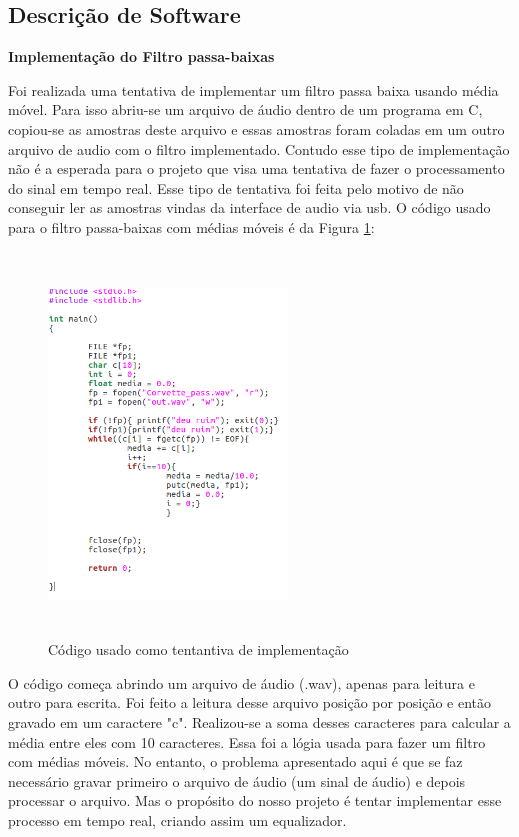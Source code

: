 \documentclass[conference]{IEEEtran}
\begin{document}
\subsection{Descrição de Software}

\begin{flushleft}

\textbf{Implementação do Filtro passa-baixas}
\end{flushleft}
 
Foi realizada uma tentativa de implementar um filtro passa baixa usando média móvel. Para isso abriu-se um arquivo de áudio dentro de um programa em C, copiou-se as amostras deste arquivo e essas amostras foram coladas em um outro arquivo de audio com o filtro implementado. 
Contudo esse tipo de implementação não é a esperada para o projeto que visa uma tentativa de fazer o processamento do sinal em tempo real. Esse tipo de tentativa foi feita pelo motivo de não conseguir ler as amostras vindas da  interface de audio via usb. O código usado para o filtro passa-baixas com médias móveis é da Figura \ref{codigo}:

\begin{figure}[!htb]
\centering
\includegraphics[width=2.5in, height=4in]{Imagens/vai}
\caption{Código usado como tentantiva de implementação} 
\label{codigo}
\end{figure}

O código começa abrindo um arquivo de áudio (.wav), apenas para leitura e outro para escrita. Foi feito a leitura desse arquivo posição por posição e então gravado em um caractere "c". Realizou-se a soma desses caracteres para calcular a média entre eles com 10 caracteres. 
Essa foi a lógia usada para fazer um filtro com médias móveis. No entanto, o problema apresentado aqui é que se faz necessário gravar primeiro o arquivo de áudio (um sinal de áudio) e depois processar o arquivo. Mas o propósito do nosso projeto é tentar implementar esse processo em tempo real, criando assim um equalizador. 
\end{document}

